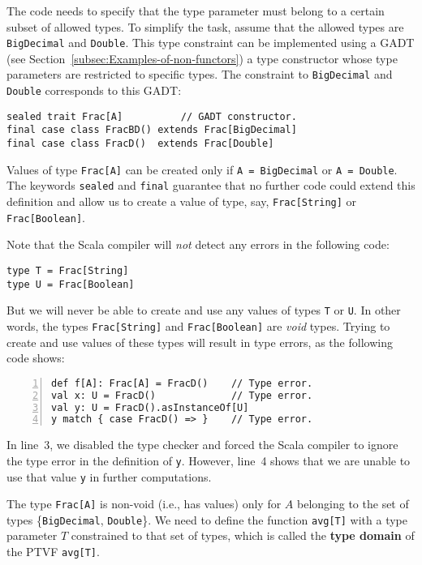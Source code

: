The code needs to specify that the type parameter must belong to a
certain subset of allowed types. To simplify the task, assume that
the allowed types are \lstinline!BigDecimal! and \lstinline!Double!.
This type constraint can be implemented using a GADT 
(see Section~\ref{subsec:Examples-of-non-functors}) \textemdash{}
a type constructor whose type parameters are restricted to specific
types. The constraint to \lstinline!BigDecimal! and \lstinline!Double!
corresponds to this GADT:
\begin{lstlisting}
sealed trait Frac[A]          // GADT constructor.
final case class FracBD() extends Frac[BigDecimal]
final case class FracD()  extends Frac[Double]
\end{lstlisting}
Values of type \lstinline!Frac[A]! can be created only if \lstinline!A = BigDecimal!
or \lstinline!A = Double!. The keywords \lstinline!sealed! and \lstinline!final!
guarantee that no further code could extend this definition and allow
us to create a value of type, say, \lstinline!Frac[String]! or \lstinline!Frac[Boolean]!. 

Note that the Scala compiler will \emph{not} detect any errors in
the following code:
\begin{lstlisting}
type T = Frac[String]
type U = Frac[Boolean]
\end{lstlisting}
But we will never be able to create and use any values of types \lstinline!T!
or \lstinline!U!. In other words, the types \lstinline!Frac[String]!
and \lstinline!Frac[Boolean]! are \emph{void} types.
Trying to create and use values of these types will result in type
errors, as the following code shows:
\begin{lstlisting}[numbers=left]
def f[A]: Frac[A] = FracD()    // Type error.
val x: U = FracD()             // Type error.
val y: U = FracD().asInstanceOf[U]
y match { case FracD() => }    // Type error.
\end{lstlisting}
In line~3, we disabled the type checker and forced the Scala compiler
to ignore the type error in the definition of \lstinline!y!. However,
line~4 shows that we are unable to use that value \lstinline!y!
in further computations.

The type \lstinline!Frac[A]! is non-void (i.e., has values) only
for $A$ belonging to the set of types \{\lstinline!BigDecimal!,
\lstinline!Double!\}. We need to define the function \lstinline!avg[T]!
with a type parameter $T$ constrained to that set of types, which
is called the \textbf{type domain} of the PTVF
\lstinline!avg[T]!. 

